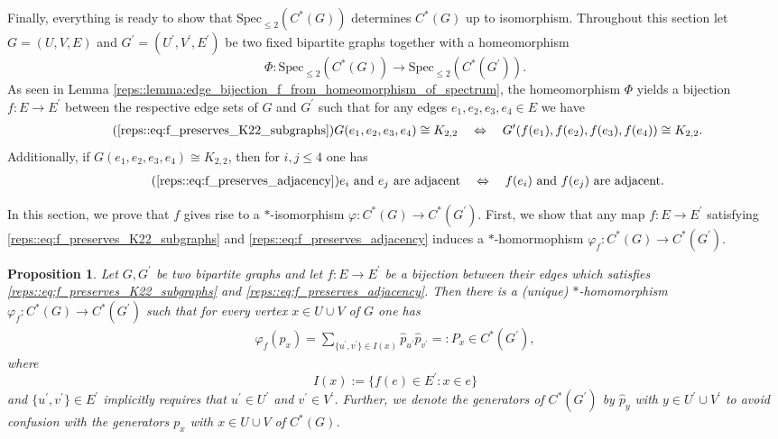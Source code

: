 \documentclass[a4paper]{amsart}
\newtheorem{proposition}[thm]{Proposition}
\begin{document}
Finally, everything is ready to show that $\mathrm{Spec}_{\leq 2}(C^\ast(G))$ determines $C^\ast(G)$ up to isomorphism. Throughout this section let $G = (U, V, E)$ and $G^\prime = (U^\prime, V^\prime, E^\prime)$ be two fixed bipartite graphs together with a homeomorphism
$$
    \Phi: \mathrm{Spec}_{\leq 2}(C^\ast(G)) \to \mathrm{Spec}_{\leq 2}(C^\ast(G^\prime)).
$$
As seen in Lemma \ref{reps::lemma:edge_bijection_f_from_homeomorphism_of_spectrum}, the homeomorphism $\Phi$ yields a bijection $f: E \to E^\prime$ between the respective edge sets of $G$ and $G^\prime$ such that for any edges $e_1, e_2, e_3, e_4 \in E$ we have 
\begin{align}
    \tag{\ref{reps::eq:f_preserves_K22_subgraphs}}
    G(e_1, e_2, e_3, e_4) \cong K_{2,2}
    \quad\Leftrightarrow\quad
    G^\prime(f(e_1), f(e_2), f(e_3), f(e_4)) \cong K_{2,2}.
\end{align}
Additionally, if $G(e_1, e_2, e_3, e_4) \cong K_{2,2}$, then for $i, j \leq 4$ one has
\begin{align}
    \tag{\ref{reps::eq:f_preserves_adjacency}}
    e_i \text{ and } e_j \text{ are adjacent} \quad\Leftrightarrow\quad f(e_i) \text{ and } f(e_j) \text{ are adjacent}.
\end{align}

In this section, we prove that $f$ gives rise to a $\ast$-isomorphism $\varphi: C^\ast(G) \to C^\ast(G^\prime)$. First, we show that any map $f: E \to E^\prime$ satisfying \eqref{reps::eq:f_preserves_K22_subgraphs} and \eqref{reps::eq:f_preserves_adjacency} induces a $\ast$-homormophism $\varphi_f: C^\ast(G) \to C^\ast(G^\prime)$.

\begin{proposition}
    \label{class::prop:construct_isomorphism_phi_from_f}
    Let $G, G^\prime$ be two bipartite graphs and let $f: E \to E^\prime$ be a bijection between their edges which satisfies \eqref{reps::eq:f_preserves_K22_subgraphs} and \eqref{reps::eq:f_preserves_adjacency}. Then there is a (unique) $\ast$-homomorphism $\varphi_f: C^\ast(G) \to C^\ast(G^\prime)$ such that for every vertex $x \in U \cup V$ of $G$ one has
    \begin{align*}
        \varphi_f(p_x) = \sum_{\{u^\prime, v^\prime\} \in I(x)} \hat{p}_{u^\prime} \hat{p}_{v^\prime} =: P_x \in C^\ast(G^\prime),
    \end{align*}
    where 
    $$
        I(x) := \{f(e) \in E^\prime: x \in e\}
    $$
    and $\{u^\prime, v^\prime\} \in E^\prime$ implicitly requires that $u^\prime \in U^\prime$ and $v^\prime \in V^\prime$. Further, we denote the generators of $C^\ast(G^\prime)$ by $\hat{p}_y$ with $y \in U^\prime \cup V^\prime$ to avoid confusion with the generators $p_x$ with $x \in U \cup V$ of $C^\ast(G)$.
\end{proposition}
\end{document}

